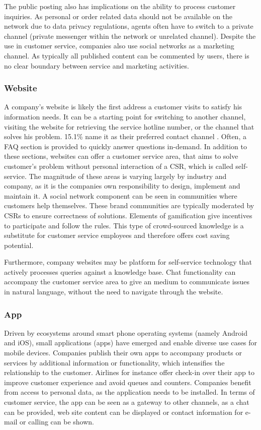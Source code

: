 		The public posting also has implications on the ability to process customer inquiries. As personal or order related data should not be available on the network due to data privacy regulations, agents often have to switch to a private channel (\ie private messenger within the network or unrelated channel). Despite the use in customer service, companies also use social networks as a marketing channel. As typically all published content can be commented by users, there is no clear boundary between service and marketing activities. 
		
		
		\subsubsection{Website}
		
		A company's website is likely the first address a customer visits to satisfy his information needs. It can be a starting point for switching to another channel, \ie visiting the website for retrieving the service hotline number, or the channel that solves his problem. 15.1\% name it as their preferred contact channel \citep{Agnischock2015}. Often, a \acrfull{FAQ} section is provided to quickly answer questions in-demand. In addition to these sections, websites can offer a customer service area, that aims to solve customer's problem without personal interaction of a \acrshort{CSR}, which is called self-service. The magnitude of these areas is varying largely by industry and company, as it is the companies own responsibility to design, implement and maintain it. A social network component can be seen in communities where customers help themselves. These brand communities \citep{Hsieh_2017} are typically moderated by \acrshort{CSR}s to ensure correctness of solutions. Elements of gamification give incentives to participate and follow the rules. This type of crowd-sourced knowledge is a substitute for customer service employees and therefore offers cost saving potential. 
		
		Furthermore, company websites may be platform for self-service technology that actively processes queries against a knowledge base. Chat functionality can accompany the customer service area to give an medium to communicate issues in natural language, without the need to navigate through the website. 
			
		\subsubsection{App}
		Driven by ecosystems around smart phone operating systems (namely Android and iOS), small applications (apps) have emerged and enable diverse use cases for mobile devices. Companies publish their own apps to accompany products or services by additional information or functionality, which intensifies the relationship to the customer. Airlines for instance offer check-in over their app to improve customer experience and avoid queues and counters. Companies benefit from access to personal data, as the application needs to be installed. In terms of customer service, the app can be seen as a gateway to other channels, as a chat can be provided, web site content can be displayed or contact information for e-mail or calling can be shown. 
		
